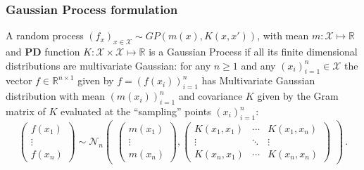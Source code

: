 \documentclass[a4paper,14pt]{article}
\newcommand{\Ncal}{\mathcal{N}}
\newcommand{\Xcal}{\mathcal{X}}
\newcommand{\Real}{\mathbb{R}}
\begin{document}

\subsubsection{Gaussian Process formulation} %
\label{ssub:gaussian_process_formulation}

A random process $(f_x)_{x\in \Xcal} \sim GP(m(x), K(x,x'))$, with mean $m : \Xcal
\mapsto \Real$ and \textbf{PD} function $K : \Xcal \times \Xcal \mapsto \Real$ is
a Gaussian Process if all its finite dimensional distributions are multivariate
Gaussian: for any $n\geq1$ and any $(x_i)_{i=1}^n \in \Xcal$ the vector $f \in \Real^{n\times 1}$
given by $f = (f(x_i))_{i=1}^n$ has Multivariate Gaussian distribution with mean
$(m(x_i))_{i=1}^n$ and covariance $K$ given by the Gram matrix of $K$ evaluated at
the ``sampling'' points $(x_i)_{i=1}^n$:
$$ \begin{pmatrix} f(x_1) \\ \vdots \\ f(x_n) \end{pmatrix}
  \sim \Ncal_n\begin{pmatrix}
    \begin{pmatrix} m(x_1) \\ \vdots \\ m(x_n) \end{pmatrix},
    \begin{pmatrix}
      K(x_1, x_1) & \cdots & K(x_1, x_n)\\
      \vdots & \ddots & \vdots\\
      K(x_n, x_1) & \cdots & K(x_n, x_n)
    \end{pmatrix}
  \end{pmatrix}
  \,. $$
\end{document}

